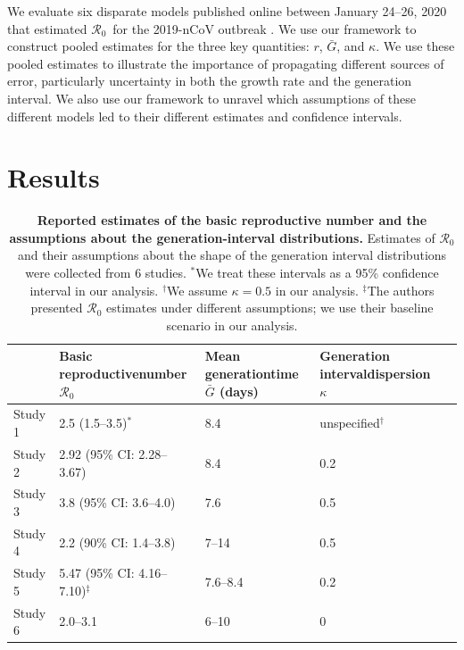 \documentclass[12pt]{article}
\newcommand{\Rx}[1]{\ensuremath{{\mathcal R}_{#1}}}
\newcommand{\Ro}{\Rx{0}\xspace}
\begin{document}
We evaluate six disparate models published online between January 24--26, 2020 that estimated \Ro\ for the 2019-nCoV outbreak \citep{imaincov, liuncov, majumderncov, readncov, riouncov, zhaoncov}. 
We use our framework to construct pooled estimates for the three key quantities: $r$, $\bar G$, and $\kappa$. 
We use these pooled estimates to illustrate the importance of propagating different sources of error, particularly uncertainty in both the growth rate and the generation interval. 
We also use our framework to unravel which assumptions of these different models led to their different estimates and confidence intervals.

\section{Results}

\begin{table}[t]
\begin{center}
\scriptsize
\begin{tabular}{l|p{3.5cm}|p{2.5cm}|p{2.5cm}|l}
 & Basic reproductive\newline number \Ro\ & Mean generation\newline time $\bar G$ (days) & Generation interval\newline dispersion $\kappa$ \\
\hline
Study 1 & 2.5 (1.5--3.5)$^\ast$ & 8.4 & unspecified$^\dagger$ & \cite{imaincov} \\
\hline
Study 2 & 2.92 (95\% CI: 2.28--3.67) & 8.4 & 0.2 & \cite{liuncov} \\
\hline
Study 3 & 3.8 (95\% CI: 3.6--4.0) & 7.6 & 0.5 & \cite{readncov} \\
\hline
Study 4 & 2.2 (90\% CI: 1.4--3.8) & 7--14 & 0.5 & \cite{riouncov} \\
\hline
Study 5 & 5.47 (95\% CI: 4.16--7.10)$^\ddagger$ & 7.6--8.4 & 0.2 & \cite{zhaoncov} \\
\hline
Study 6 & 2.0--3.1 & 6--10 & 0 & \cite{majumderncov} \\
\hline
\end{tabular}
\end{center}
\caption{
\textbf{Reported estimates of the basic reproductive number and the assumptions about the generation-interval distributions.}
Estimates of \Ro and their assumptions about the shape of the generation interval distributions were collected from 6 studies.
$^\ast$We treat these intervals as a 95\% confidence interval in our analysis.
$^\dagger$We assume $\kappa = 0.5$ in our analysis.
$^\ddagger$The authors presented \Ro estimates under different assumptions; we use their baseline scenario in our analysis.
}
\end{table}
\end{document}
